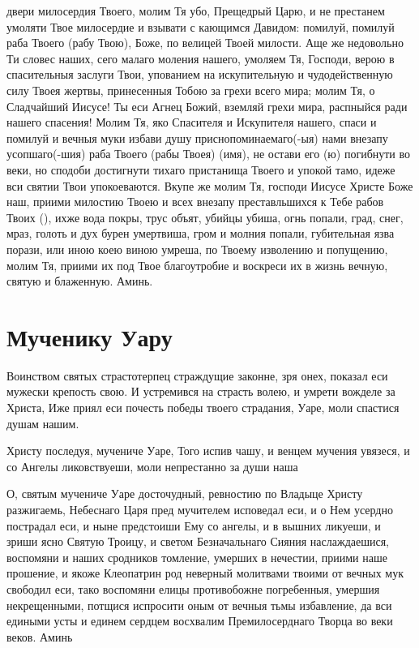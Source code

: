 \begin{mymulticols}
двери милосердия Твоего, молим Тя убо, Прещедрый Царю, и не престанем умоляти Твое милосердие и взывати с кающимся Давидом: помилуй, помилуй раба Твоего (рабу Твою), Боже, по велицей Твоей милости. Аще же недовольно Ти словес наших, сего малаго моления нашего, умоляем Тя, Господи, верою в спасительныя заслуги Твои, упованием на искупительную и чудодейственную силу Твоея жертвы, принесенныя Тобою за грехи всего мира; молим Тя, о Сладчайший Иисусе! Ты еси Агнец Божий, вземляй грехи мира, распныйся ради нашего спасения! Молим Тя, яко Спасителя и Искупителя нашего, спаси и помилуй и вечныя муки избави душу приснопоминаемаго(-ыя) нами внезапу усопшаго(-шия) раба Твоего (рабы Твоея) (имя), не остави его (ю) погибнути во веки, но сподоби достигнути тихаго пристанища Твоего и упокой тамо, идеже вси святии Твои упокоеваются. Вкупе же молим Тя, господи Иисусе Христе Боже наш, приими милостию Твоею и всех внезапу преставльшихся к Тебе рабов Твоих (), ихже вода покры, трус объят, убийцы убиша, огнь попали, град, снег, мраз, голоть и дух бурен умертвиша, гром и молния попали, губительная язва порази, или иною коею виною умреша, по Твоему изволению и попущению, молим Тя, приими их под Твое благоутробие и воскреси их в жизнь вечную, святую и блаженную. Аминь.

\end{mymulticols}

\mychapterending

 

\section{Мученику Уару}\begin{mymulticols}


Воинством святых страстотерпец страждущие законне, зря онех, показал еси мужески крепость свою. И устремився на страсть волею, и умрети вожделе за Христа, Иже приял еси почесть победы твоего страдания, Уаре, моли спастися душам нашим.


Христу последуя, мучениче Уаре, Того испив чашу, и венцем мучения увязеся, и со Ангелы ликовствуеши, моли непрестанно за души наша


О, святым мучениче Уаре досточудный, ревностию по Владыце Христу разжигаемь, Небеснаго Царя пред мучителем исповедал еси, и о Нем усердно пострадал еси, и ныне предстоиши Ему со ангелы, и в вышних ликуеши, и зриши ясно Святую Троицу, и светом Безначальнаго Сияния наслаждаешися, воспомяни и наших сродников томление, умерших в нечестии, приими наше прошение, и якоже Клеопатрин род неверный молитвами твоими от вечных мук свободил еси, тако воспомяни елицы противобожне погребенныя, умершия некрещенными, потщися испросити оным от вечныя тьмы избавление, да вси едиными усты и единем сердцем восхвалим Премилосерднаго Творца во веки веков. Аминь

\end{mymulticols}

